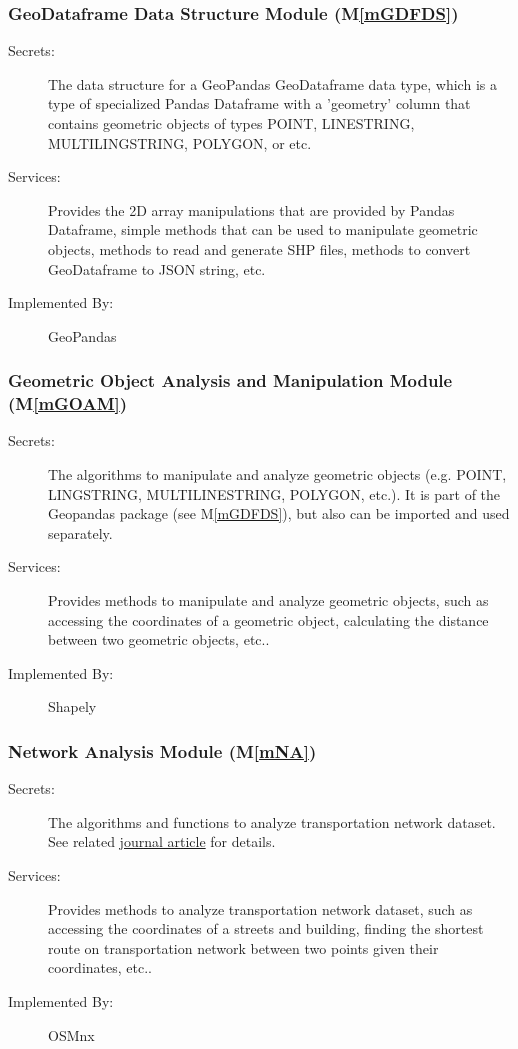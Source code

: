 \documentclass[12pt, titlepage]{article}
\newcommand{\mref}[1]{M\ref{#1}}
\begin{document}
\subsubsection{GeoDataframe Data Structure Module (\mref{mGDFDS})}

\begin{description}
\item[Secrets:]The data structure for a GeoPandas GeoDataframe data type, which is a type of specialized Pandas Dataframe with a 'geometry' column that contains geometric objects of types POINT, LINESTRING, MULTILINGSTRING, POLYGON, or etc.
\item[Services:] Provides the 2D array manipulations that are provided by Pandas Dataframe, simple methods that can be used to manipulate geometric objects, methods to read and generate SHP files, methods to convert GeoDataframe to JSON string, etc.
\item[Implemented By:] GeoPandas
\end{description}

\subsubsection{Geometric Object Analysis and Manipulation Module (\mref{mGOAM})}

\begin{description}
\item[Secrets:]The algorithms to manipulate and analyze geometric objects (e.g. POINT, LINGSTRING, MULTILINESTRING, POLYGON, etc.). It is part of the Geopandas package (see \mref{mGDFDS}), but also can be imported and used separately.
\item[Services:] Provides methods to manipulate and analyze geometric objects, such as accessing the coordinates of a geometric object, calculating the distance between two geometric objects, etc..
\item[Implemented By:] Shapely
\end{description}

\subsubsection{Network Analysis Module (\mref{mNA})}

\begin{description}
\item[Secrets:] The algorithms and functions to analyze transportation network dataset. See related \href{https://geoffboeing.com/publications/osmnx-complex-street-networks/}{journal article} \citep{OSMnxArticle} for details. 
\item[Services:] Provides methods to analyze transportation network dataset, such as accessing the coordinates of a streets and building, finding the shortest route on transportation network between two points given their coordinates, etc..
\item[Implemented By:] OSMnx
\end{description}
\end{document}
